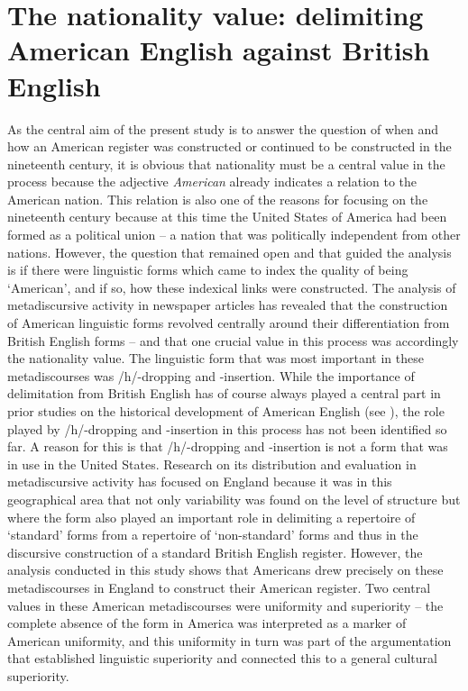 \section[The nationality value]{The nationality value: delimiting American English against British English}
\hypertarget{Toc63021247}{}
As the central aim of the present study is to answer the question of when and how an American register was constructed or continued to be constructed in the nineteenth century, it is obvious that nationality must be a central value in the process because the adjective \emph{American} already indicates a relation to the American nation. This relation is also one of the reasons for focusing on the nineteenth century because at this time the United States of America had been formed as a political union – a nation that was politically independent from other nations. However, the question that remained open and that guided the analysis is if there were linguistic forms which came to index the quality of being ‘American’, and if so, how these indexical links were constructed. The analysis of metadiscursive activity in newspaper articles has revealed that the construction of American linguistic forms revolved centrally around their differentiation from British English forms – and that one crucial value in this process was accordingly the nationality value. The linguistic form that was most important in these metadiscourses was /h/-dropping and -insertion. While the importance of delimitation from British English has of course always played a central part in prior studies on the historical development of American English (see ), the role played by /h/-dropping and -insertion in this process has not been identified so far. A reason for this is that /h/-dropping and -insertion is not a form that was in use in the United States. Research on its distribution and evaluation in metadiscursive activity has focused on England because it was in this geographical area that not only variability was found on the level of structure but where the form also played an important role in delimiting a repertoire of ‘standard’ forms from a repertoire of ‘non-standard’ forms and thus in the discursive construction of a standard British English register. However, the analysis conducted in this study shows that Americans drew precisely on these metadiscourses in England to construct their American register. Two central values in these American metadiscourses were uniformity and superiority – the complete absence of the form in America was interpreted as a marker of American uniformity, and this uniformity in turn was part of the argumentation that established linguistic superiority and connected this to a general cultural superiority.


